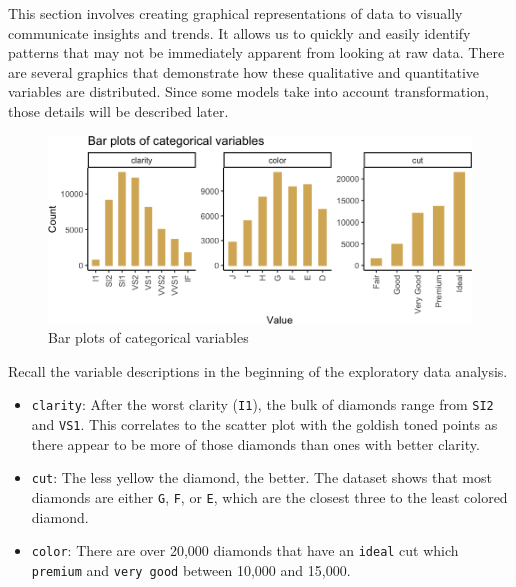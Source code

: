 \documentclass[
  paper=a4,
  ,captions=tableheading
]{scrartcl}
\begin{document}
This section involves creating graphical representations of data to
visually communicate insights and trends. It allows us to quickly and
easily identify patterns that may not be immediately apparent from
looking at raw data. There are several graphics that demonstrate how
these qualitative and quantitative variables are distributed. Since some
models take into account transformation, those details will be described
later.

\begin{figure}[H]

{\centering \includegraphics[width=\linewidth,]{Diamonds_PDF_files/figure-latex/categorical bar plots-1} 

}

\caption{Bar plots of categorical variables}\label{fig:categorical bar plots}
\end{figure}

Recall the variable descriptions in the beginning of the exploratory
data analysis.

\begin{itemize}
\item
  \texttt{clarity}: After the worst clarity (\texttt{I1}), the bulk of
  diamonds range from \texttt{SI2} and \texttt{VS1}. This correlates to
  the scatter plot with the goldish toned points as there appear to be
  more of those diamonds than ones with better clarity.
\item
  \texttt{cut}: The less yellow the diamond, the better. The dataset
  shows that most diamonds are either \texttt{G}, \texttt{F}, or
  \texttt{E}, which are the closest three to the least colored diamond.
\item
  \texttt{color}: There are over 20,000 diamonds that have an
  \texttt{ideal} cut which \texttt{premium} and \texttt{very\ good}
  between 10,000 and 15,000.
\end{itemize}
\end{document}
